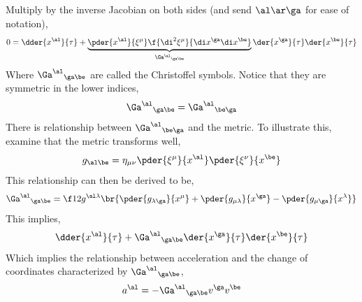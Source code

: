 \documentclass{article}
\begin{document}
Multiply by the inverse Jacobian on both sides (and send $\al \ar \ga$ for ease of notation),
\[ 0 = \dder{x^\al}{\tau}  + \underbrace{\pder{x^\al}{\xi^\mu} \f{\di^2\xi^\mu}{\di x^\ga\di x^\be}}_{{\Ga^\al}_{\ga\be}}\der{x^\ga}{\tau}\der{x^\be}{\tau} \]
Where ${\Ga^\al}_{\ga\be}$ are called the Christoffel symbols. Notice that they are symmetric in the lower indices,
\[ {\Ga^\al}_{\ga\be} = {\Ga^\al}_{\be\ga} \]
There is relationship between ${\Ga^\al}_{\be\ga}$ and the metric. To illustrate this, examine that the metric transforms well,
\[ g_{\al\be} = \eta_{\mu\nu} \pder{\xi^\mu}{x^\al}\pder{\xi^\nu}{x^\be} \]
This relationship can then be derived to be,
\[ {\Ga^\al}_{\ga\be} = \f12 g^{\al\lambda}\br{\pder{g_{\lambda\ga}}{x^\mu} + \pder{g_{\mu\lambda}}{x^\ga}-\pder{g_{\mu\ga}}{x^\lambda}} \]
This implies,
\[ \dder{x^\al}{\tau} + {\Ga^\al}_{\ga\be} \der{x^\ga}{\tau} \der{x^\be}{\tau} \]
Which implies the relationship between acceleration and the change of coordinates characterized by ${\Ga^\al}_{\ga\be}$,
\[ a^\al = - {\Ga^\al}_{\ga\be}  v^\ga  v^\be\]
\end{document}
